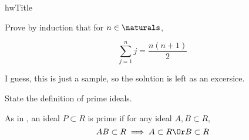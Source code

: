 \documentclass{article}
\newcommand{\basedir}{..}
\begin{document}
{hwTitle}
\let\basedir\undefined

\problemsec

Prove by induction that for $n\in\naturals$,

\[
\sum_{j=1}^n j=\frac{n(n+1)}{2}
\]

\solution

I guess, this is just a sample, so the solution is left as an excersice.

\problemsec

State the definition of prime ideals.

\solution

As in \parencite[126]{hungerford}, an ideal $P\subset R$ is prime if for any ideal $A,B \subset R$,
\[
    AB\subset R\implies A\subset R \Or B\subset R
\]

\printbibliography
\end{document}
